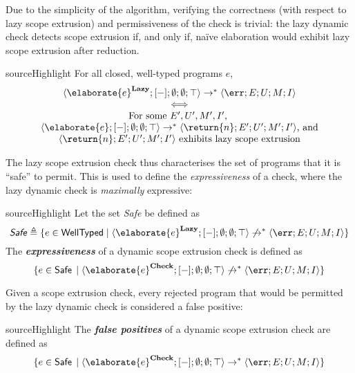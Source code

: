 Due to the simplicity of the algorithm, verifying the correctness (with respect to lazy scope extrusion) and permissiveness of the check is trivial: the lazy dynamic check detects scope extrusion if, and only if, naïve elaboration would exhibit lazy scope extrusion after reduction.

\begin{theorem}{sourceHighlight}
For all closed, well-typed \sourceLang{} programs $e$,
\[\begin{array}{c}
\langle \elaborate{e}^{\textbf{Lazy}}; [-]; \emptyset; \emptyset; \top \rangle \to^{*} \langle \err; E; U; M; I \rangle \\
\iff \\
\text{For some $E', U', M', I'$, }\\
\langle \elaborate{e}; [-]; \emptyset; \emptyset; \top \rangle \to^{*} \langle \return{n}; E'; U'; M'; I' \rangle\text{, and}\\
\langle \return{n}; E'; U'; M'; I' \rangle \text{ exhibits lazy scope extrusion}
\end{array}
\]
\end{theorem}

The lazy scope extrusion check thus characterises the set of \sourceLang{} programs that it is ``safe'' to permit. This is used to define the \textit{expressiveness} of a check, where the lazy dynamic check is \textit{maximally} expressive:

\begin{definition}{sourceHighlight}
Let the set \emph{\textsf{Safe}} be defined as 
\[\textsf{\emph{Safe}} \triangleq \{ e \in \textsf{WellTyped} \mid \langle \elaborate{e}^{\textbf{Lazy}}; [-]; \emptyset ; \emptyset ; \top \rangle \not\to^{*} \langle \err ; E ; U ; M ; I \rangle \}\]
The \emph{\textbf{expressiveness}} of a dynamic scope extrusion check is defined as 
 \[\{ e \in \textsf{{Safe}}\, \mid \langle \elaborate{e}^{\textbf{Check}};[-];\emptyset;\emptyset;\top \rangle \not\to^{*} \langle \err ; E ; U ; M ; I \rangle \} \]
\end{definition}

Given a scope extrusion check, every rejected program that would be permitted by the lazy dynamic check is considered a false positive:
\begin{definition}{sourceHighlight}
The \emph{\textbf{false positives}} of a dynamic scope extrusion check are defined as 
 \[\{ e \in \textsf{Safe}\, \mid \langle \elaborate{e}^{\textbf{Check}};[-];\emptyset;\emptyset;\top \rangle \to^{*} \langle \err ; E ; U ; M ; I \rangle \} \]
\end{definition}

